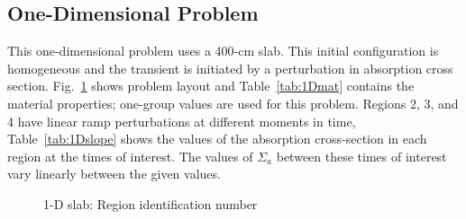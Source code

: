 \documentclass{elsarticle}
\newcommand{\fig}[1]{Fig.~\ref{#1}}                      %
\newcommand{\tbl}[1]{Table~\ref{#1}}                     %
\begin{document}
\subsection{One-Dimensional Problem}

This one-dimensional problem uses a 400-cm slab. This initial configuration is homogeneous and the transient is initiated by a perturbation in absorption cross section. 
\fig{fig:slab} shows problem layout and \tbl{tab:1Dmat} contains the material properties; one-group values are used for this problem. 
Regions 2, 3, and 4 have linear ramp perturbations at different moments in time, \tbl{tab:1Dslope} shows the values of the absorption cross-section in each region at the 
times of interest.  The values of $\Sigma_a$ between these times of interest vary linearly between the given values.

\begin{figure}[!htbp]
\begin{center}
\caption{1-D slab: Region identification number}
\label{fig:slab}
\end{center}
\end{figure}

\begin{table}[!htbp]
\begin{center}
\caption{1-D slab material properties and problem parameters}
\label{tab:1Dmat}
\end{center}
\end{table}
\end{document}
